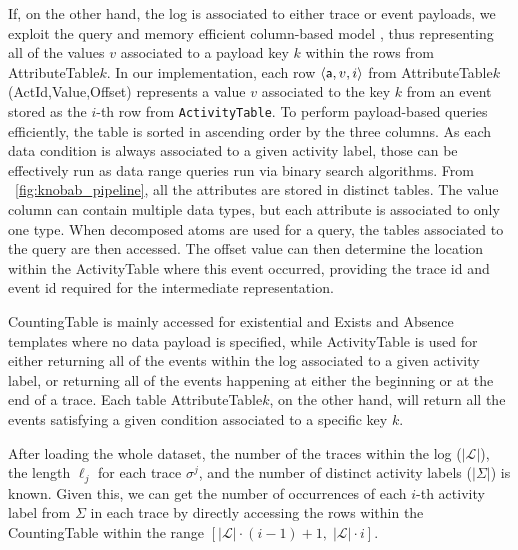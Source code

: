 If, on the other hand, the log is associated to either trace or event payloads, we exploit 
the query and memory efficient  column-based model \cite{IdreosGNMMK12}, thus representing all of the values $v$ associated to a  payload key $k$ within the rows from  \textsf{AttributeTable$k$}. In our implementation, each row $\braket{\textsf{a},v,i}$ from  \textsf{AttributeTable$k$(ActId,Value,Offset)} represents a value $v$ associated to the key $k$ from an event stored as the $i$-th row from \texttt{ActivityTable}. To perform payload-based queries efficiently, the table is sorted in ascending order by the  three columns. As each data condition is always associated to a given activity label, those can be effectively run as data range queries run via binary search algorithms. From \figurename~\ref{fig:knobab_pipeline}, all the attributes are stored in distinct tables. The value column can contain multiple data types, but each attribute is associated to only one type. When decomposed atoms are used for a query, the tables associated to the query are then accessed. The offset value can then determine the location within the \textsf{ActivityTable} where this event occurred, providing the trace id and event id required for the intermediate representation.

\textsf{CountingTable} is mainly accessed for existential and \textsf{Exists} and \textsf{Absence} templates where no data payload is specified, while  \textsf{ActivityTable} is  used for either returning all of the events within the log associated to a given activity label, or returning all of the events happening at either the beginning or at the end of a trace. Each table \textsf{AttributeTable$k$}, on the other hand, will %
return all the events satisfying a given condition associated to a specific %
key $k$. %

After loading the whole dataset, the number of the traces within the log ($|\mathcal{L}|$), the length $\ell_j$ for each trace $\sigma^j$, and the number of distinct activity labels ($|\Sigma|$) is known. Given this, we can get the number of occurrences of each $i$-th activity label from $\Sigma$ in each trace by directly accessing the rows within the \textsf{CountingTable} within the range $[|\mathcal{L}|\cdot (i-1) + 1,\; |\mathcal{L}|\cdot i]$.

